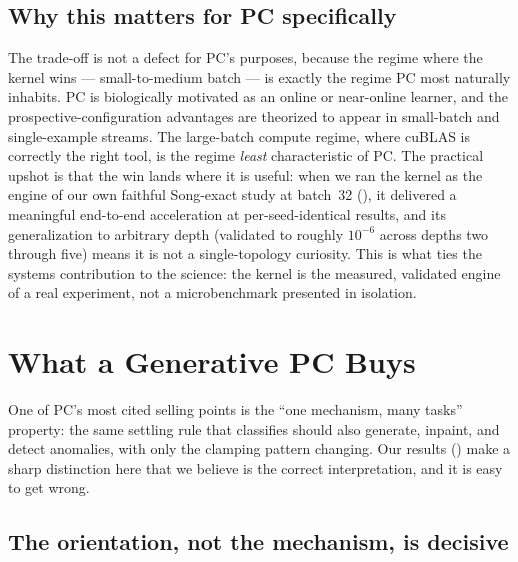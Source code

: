 \subsection{Why this matters for PC specifically}

The trade-off is not a defect for PC's purposes, because the regime where the kernel wins ---
small-to-medium batch --- is exactly the regime PC most naturally inhabits. PC is biologically
motivated as an online or near-online learner, and the prospective-configuration advantages are
theorized to appear in small-batch and single-example streams. The large-batch compute regime, where
cuBLAS is correctly the right tool, is the regime \emph{least} characteristic of PC. The practical
upshot is that the win lands where it is useful: when we ran the kernel as the engine of our own
faithful Song-exact study at batch~32 (), it delivered a meaningful end-to-end
acceleration at per-seed-identical results, and its generalization to arbitrary depth (validated to
roughly $10^{-6}$ across depths two through five) means it is not a single-topology curiosity. This
is what ties the systems contribution to the science: the kernel is the measured, validated engine of
a real experiment, not a microbenchmark presented in isolation.

\section{What a Generative PC Buys}\label{sec:disc-generative}

One of PC's most cited selling points is the ``one mechanism, many tasks'' property: the same
settling rule that classifies should also generate, inpaint, and detect anomalies, with only the
clamping pattern changing. Our results () make a sharp distinction here that we
believe is the correct interpretation, and it is easy to get wrong.

\subsection{The orientation, not the mechanism, is decisive}

